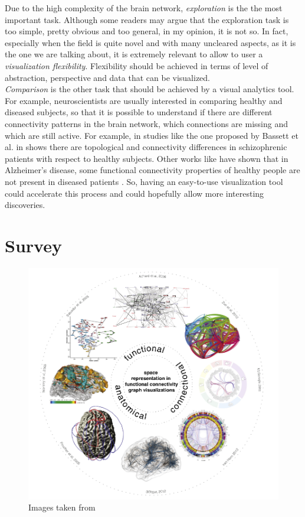 \documentclass{article}
\begin{document}
\begin{multicols}{2}
Due to the high complexity of the brain network, \textit{exploration} is the the most important task. Although some readers may argue that the exploration task is too simple, pretty obvious and too general, in my opinion, it is not so. In fact, especially when the field is quite novel and with many uncleared aspects, as it is the one we are talking about, it is extremely relevant to allow to user a \textit{visualization flexibility}. Flexibility should be achieved in terms of level of abstraction, perspective and data that can be visualized. \\

\textit{Comparison} is the other task that should be achieved by a visual analytics tool. For example, neuroscientists are usually interested in comparing healthy and diseased subjects, so that it is possible to understand if there are different connectivity patterns in the brain network, which connections are missing and which are still active. For example, in studies like the one proposed by Bassett et al. in \cite{hierarchicalOrganization} shows there are topological and connectivity differences in schizophrenic patients with respect to healthy subjects. Other works like \cite{alzheimer} have shown that in Alzheimer's disease, some functional connectivity properties of healthy people are not present in diseased patients . So, having an easy-to-use visualization tool could accelerate this process and could hopefully allow more interesting discoveries.

\section{Survey}
\begin{figure}[ht]
\centering
\includegraphics[width = 1.8\columnwidth]{taxonomy}
\caption{Images taken from \cite{visualizingHumanConnectome}}
\label{fig:taxonomy}
\end{figure}


\end{multicols}
\end{document}
